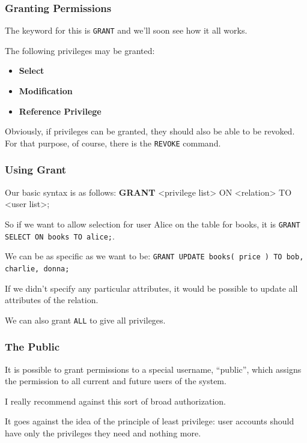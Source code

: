 \begin{frame}
\frametitle{Granting Permissions}

The keyword for this is \texttt{GRANT} and we'll soon see how it all works. 

The following privileges may be granted:

\begin{itemize}
	\item \textbf{Select}
	\item \textbf{Modification}
	\item \textbf{Reference Privilege}
\end{itemize}

Obviously, if privileges can be granted, they should also be able to be revoked. For that purpose, of course, there is the \texttt{REVOKE} command. 

\end{frame}



\begin{frame}
\frametitle{Using Grant}

Our basic syntax is as follows: \textbf{GRANT} <privilege list> ON <relation> TO <user list>; 

So if we want to allow selection for user Alice on the table for books, it is \texttt{GRANT SELECT ON books TO alice;}.

 We can be as specific as we want to be: \texttt{GRANT UPDATE books( price ) TO bob, charlie, donna;} 
 
 
If we didn't specify any particular attributes, it would be possible to update all attributes of the relation. 

We can also grant \texttt{ALL} to give all privileges. 

\end{frame}



\begin{frame}
\frametitle{The Public}

It is possible to grant permissions to a special username, ``public'', which assigns the permission to all current and future users of the system. 

I really recommend against this sort of broad authorization. 

It goes against the idea of the principle of least privilege: user accounts should have only the privileges they need and nothing more.

\end{frame}



